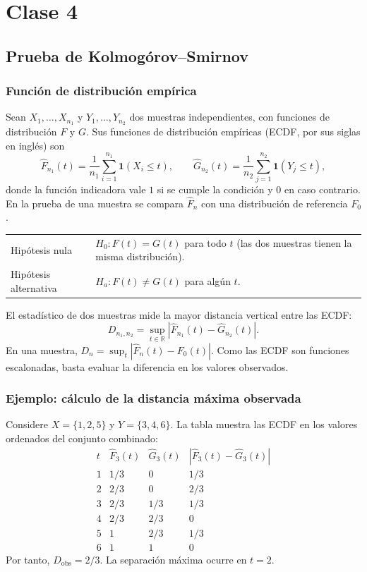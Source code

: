\section{Clase 4}


\subsection{Prueba de Kolmogórov--Smirnov}

\subsubsection{Función de distribución empírica}

Sean $X_1,\ldots,X_{n_1}$ y $Y_1,\ldots,Y_{n_2}$ dos muestras independientes, con funciones de distribución $F$ y $G$. Sus funciones de distribución empíricas (ECDF, por sus siglas en inglés) son
\[
  \widehat F_{n_1}(t)=\frac{1}{n_1}\sum_{i=1}^{n_1}\mathbf{1}(X_i\le t),
  \qquad
  \widehat G_{n_2}(t)=\frac{1}{n_2}\sum_{j=1}^{n_2}\mathbf{1}(Y_j\le t),
\]
donde la función indicadora vale $1$ si se cumple la condición y $0$ en caso contrario. En la prueba de una muestra se compara $\widehat F_n$ con una distribución de referencia $F_0$.

\begin{center}
\begin{tabularx}{0.88\linewidth}{@{}lX@{}}
  \toprule
  Hipótesis nula & $H_0:F(t)=G(t)$ para todo $t$ (las dos muestras tienen la misma distribución).\\
  Hipótesis alternativa & $H_a:F(t)\ne G(t)$ para algún $t$.\\
  \bottomrule
\end{tabularx}
\end{center}

El estadístico de dos muestras mide la mayor distancia vertical entre las ECDF:
\[
  D_{n_1,n_2}=\sup_{t\in\mathbb R}\left|\widehat F_{n_1}(t)-\widehat G_{n_2}(t)\right|.
\]
En una muestra, $D_n=\sup_t|\widehat F_n(t)-F_0(t)|$. Como las ECDF son funciones escalonadas, basta evaluar la diferencia en los valores observados.

\subsubsection{Ejemplo: cálculo de la distancia máxima observada}

Considere $X=\{1,2,5\}$ y $Y=\{3,4,6\}$. La tabla muestra las ECDF en los valores ordenados del conjunto combinado:
\[
\begin{array}{c|c|c|c}
  t & \widehat F_3(t) & \widehat G_3(t) & |\widehat F_3(t)-\widehat G_3(t)|\\
  \hline
  1 & 1/3 & 0   & 1/3\\
  2 & 2/3 & 0   & 2/3\\
  3 & 2/3 & 1/3 & 1/3\\
  4 & 2/3 & 2/3 & 0\\
  5 & 1   & 2/3 & 1/3\\
  6 & 1   & 1   & 0
\end{array}
\]
Por tanto, $D_{\mathrm{obs}}=2/3$. La separación máxima ocurre en $t=2$.

